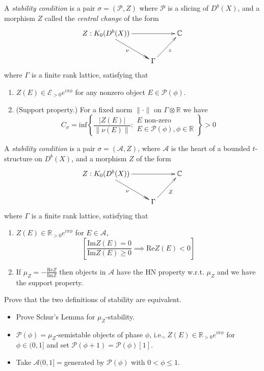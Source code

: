 \begin{definition}
\label{definition-stability-condition-1}
A {\it stability condition} is a pair $\sigma=(\mathcal{P},Z)$ where
$\mathcal{P}$ is a slicing of $D^b(X)$, and a morphism $Z$ called the  {\it
central change} of the form
$$
\xymatrix{
Z:K_0(D^b(X))\ar[rr]\ar@{->>}[dr]_\nu&  &  \mathbb{C}\\
&  \Gamma \ar[ur]_z
}
$$
where $\Gamma$ is a finite rank lattice, satisfying that
\begin{enumerate}
\item $Z(E) \in \mathcal{E}_{>0}e^{i\pi \phi}$ for any nonzero object $E \in
\mathcal{P}(\phi)$.
\item (Support property.) 
For a fixed norm $\|\cdot\|$ on $\Gamma \otimes \mathbb{R}$ we have
$$
C_{\sigma}=\text{inf}\left\{ \frac{|Z(E)|}{\|\nu(E)\|}:\substack{
\text{$E$ non-zero} \\ E \in \mathcal{P}(\phi),\phi \in \mathbb{R}} \right\} >0
$$
\end{enumerate}
\end{definition}

\begin{definition}
\label{definition-stability-condition-2}
A {\it stability condition} is a pair $\sigma=(\mathcal{A},Z)$, where
$\mathcal{A}$ is the heart of a bounded $t$-structure on $D^b(X)$, 
and a morphism $Z$ of the form
$$
\xymatrix{
Z:K_0(D^b(X))\ar[rr]\ar@{->>}[dr]_\nu&  &  \mathbb{C}\\
&  \Gamma \ar[ur]_Z
}
$$
where $\Gamma$ is a finite rank lattice, satisfying that
\begin{enumerate}
\item $Z(E) \in \mathbb{R}_{>0}e^{i\pi \phi}$ for $E \in \mathcal{A}$,
$$
\left[ \frac{\text{Im}Z(E)=0}{\text{Im}Z(E)\geq 0}\implies 
\text{Re}Z(E)<0 \right] 
$$
\item If $\mu_Z=-\frac{\text{Re}Z}{\text{Im}Z}$ then objects in $\mathcal{A}$
have the HN property w.r.t. $\mu_Z$ and we have the support property.
\end{enumerate}
\end{definition}

\begin{exercise}
\label{exercise-definitions-are-equivalent}
Prove that the two definitions of stability are equivalent.
\begin{itemize}
\item Prove Schur's Lemma for $\mu_Z$-stability.
\item $\mathcal{P}(\phi)=\mu_Z$-semistable objects of phase $\phi$, i.e., $Z(E)
\in \mathbb{R}_{>0}e^{i\pi\phi}$ for $\phi \in (0,1]$ and set
$\mathcal{P}(\phi+1)=\mathcal{P}(\phi)[1]$.
\item Take $\mathcal{A}(0,1]=$generated by $\mathcal{P}(\phi)$ with 
$0<\phi\leq 1$.
\end{itemize}
\end{exercise}


